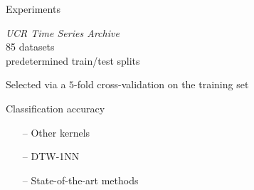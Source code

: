 \begin{frame}{Experiments}
      \begin{description}[%
        labelwidth=\widthof{Comparison}
        ]
        \item[Datasets] \textit{UCR Time Series Archive} \\85 datasets \\ predetermined train/test splits 
        \item[Hyperparameters] 
            Selected via a $5$-fold cross-validation on the training set
        \item[Evaluation metric] 
            Classification accuracy
        \item[Comparison partners] 
            \begin{itemize}
                \item[--] Other kernels
                \item[--] DTW-1NN
                \item[--] State-of-the-art methods
            \end{itemize}
        \end{description}
\end{frame}

